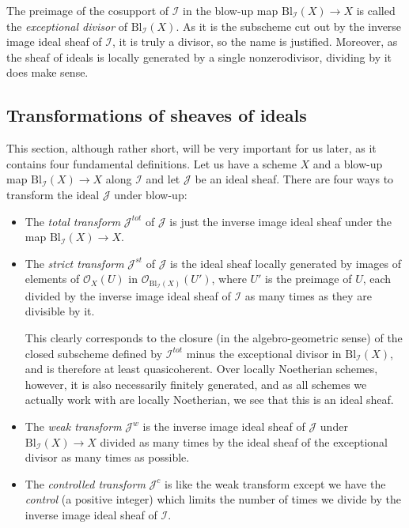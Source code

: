 \documentclass[12pt,a4paper,leqno]{article}
\newcommand{\OO}{\mathcal{O}}
\newcommand{\bl}{\mathrm{Bl}}
\theoremstyle{plain}
\theoremstyle{definition}
\theoremstyle{remark}
\begin{document}
The preimage of the cosupport of $\mathscr{I}$ in the blow-up map $\bl_{\mathscr{I}} (X) \to X$ is called the \emph{exceptional divisor} of $\bl_{\mathscr{I}} (X)$. As it is the subscheme cut out by the inverse image ideal sheaf of $\mathscr{I}$, it is truly a divisor, so the name is justified. Moreover, as the sheaf of ideals is locally generated by a single nonzerodivisor, dividing by it does make sense. 

\subsection{Transformations of sheaves of ideals}

This section, although rather short, will be very important for us later, as it contains four fundamental definitions. Let us have a scheme $X$ and a blow-up map $\bl_{\mathscr{I}}(X) \to X$ along $\mathscr{I}$ and let $\mathscr{J}$ be an ideal sheaf. There are four ways to transform the ideal $\mathscr{J}$ under blow-up:

\begin{itemize}
\item The \emph{total transform} $\mathscr{J}^{tot}$ of $\mathscr{J}$ is just the inverse image ideal sheaf under the map $\bl_{\mathscr{I}}(X) \to X$.

\item The \emph{strict transform} $\mathscr{J}^{st}$ of $\mathscr{J}$ is the ideal sheaf locally generated by images of elements of $\OO_X (U)$ in $\OO_{\bl_{\mathscr{I}}(X)}(U')$, where $U'$ is the preimage of $U$, each divided by the inverse image ideal sheaf of $\mathscr{I}$ as many times as they are divisible by it.

This clearly corresponds to the closure (in the algebro-geometric sense) of the closed subscheme defined by $\mathscr{I}^{tot}$ minus the exceptional divisor in $\bl_{\mathscr{I}} (X)$, and is therefore at least quasicoherent. Over locally Noetherian schemes, however, it is also necessarily finitely generated, and as all schemes we actually work with are locally Noetherian, we see that this is an ideal sheaf.

\item The \emph{weak transform} $\mathscr{J}^{w}$ is the inverse image ideal sheaf of $\mathscr{J}$ under $\bl_{\mathscr{I}}(X) \to X$ divided as many times by the ideal sheaf of the exceptional divisor as many times as possible.

\item The \emph{controlled transform} $\mathscr{J}^{c}$ is like the weak transform except we have the \emph{control} (a positive integer) which limits the number of times we divide by the inverse image ideal sheaf of $\mathscr{I}$.
\end{itemize}
\end{document}
